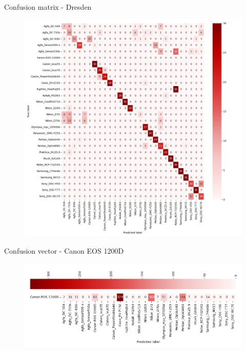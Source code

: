 \begin{frame}{Confusion matrix - Dresden}
    \vspace{-.9em}
    \begin{figure}
        \centering
        \includegraphics[height=.87\textheight]{../drawable/results/confmatrix-dresden.png}
    \end{figure}
\end{frame}

\begin{frame}{Confusion vector - Canon EOS 1200D}
    \vspace{-.9em}
    \begin{figure}
        \centering
        \includegraphics[width=\textwidth]{../drawable/results/confmatrix-outcamera-cropped.png}
    \end{figure}
\end{frame}

